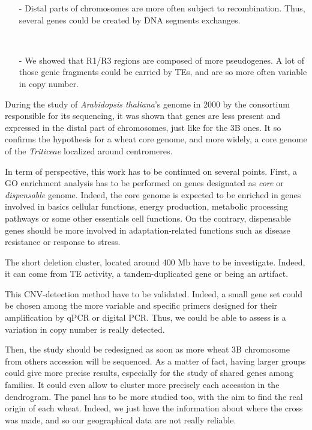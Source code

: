 \documentclass[a4paper, 12pt]{article}
\begin{document}
\begin{onehalfspace}
\begin{itemize}
\item[-] Distal parts of chromosomes are more often subject to recombination. Thus, several genes could be created by DNA segments exchanges.

\newpage %
\thispagestyle{empty}
~
\addtocounter{page}{-1}
\newpage
\clearpage %

\item[-] We showed that R1/R3 regions are composed of more pseudogenes. A lot of those genic fragments could be carried by TEs, and are so more often variable in copy number. 
\end{itemize}

During the study of \textit{Arabidopsis thaliana}'s genome in 2000 by the consortium responsible for its sequencing, it was shown that genes are less present and expressed in the distal part of chromosomes, just like for the 3B ones. It so confirms the hypothesis for a wheat core genome, and more widely, a core genome of the \textit{Triticeae} localized around centromeres. 

\vspace{0.5cm}

In term of perspective, this work has to be continued on several points. First, a GO enrichment analysis has to be performed on genes designated as \textit{core} or \textit{dispensable} genome. Indeed, the core genome is expected to be enriched in genes involved in basics cellular functions, energy production, metabolic processing pathways or some other essentials cell functions. On the contrary, dispensable genes should be more involved in adaptation-related functions such as disease resistance or response to stress.

The short deletion cluster, located around 400 Mb have to be investigate. Indeed, it can come from TE activity, a tandem-duplicated gene or being an artifact.

This CNV-detection method have to be validated. Indeed, a small gene set could be chosen among the more variable and specific primers designed for their amplification by qPCR or digital PCR. Thus, we could be able to assess is a variation in copy number is really detected.

Then, the study should be redesigned as soon as more wheat 3B chromosome from others accession will be sequenced. As a matter of fact, having larger groups could give more precise results, especially for the study of shared genes among families. It could even allow to cluster more precisely each accession in the dendrogram. The panel has to be more studied too, with the aim to find the real origin of each wheat. Indeed, we just have the information about where the cross was made, and so our geographical data are not really reliable. 


\end{onehalfspace}
\end{document}
